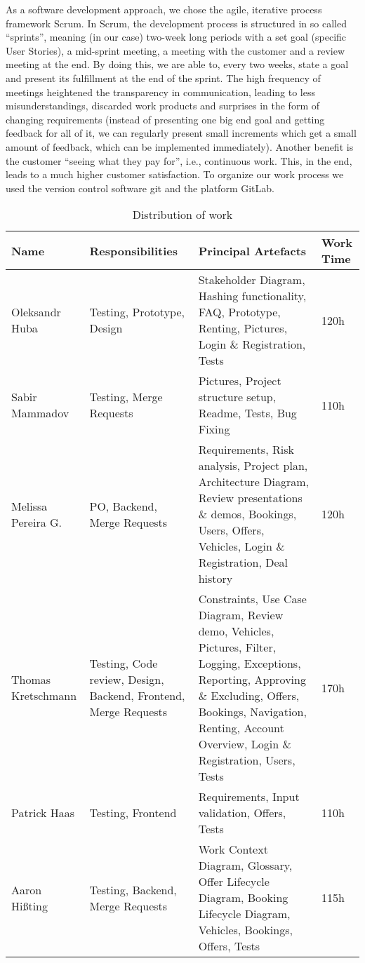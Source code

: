 As a software development approach, we chose the agile, iterative process framework Scrum. In Scrum, the development process is structured in so called “sprints”, meaning (in our case) two-week long periods with a set goal (specific User Stories), a mid-sprint meeting, a meeting with the customer and a review meeting at the end. By doing this, we are able to, every two weeks, state a goal and present its fulfillment at the end of the sprint. The high frequency of meetings heightened the transparency in communication, leading to less misunderstandings, discarded work products and surprises in the form of changing requirements (instead of presenting one big end goal and getting feedback for all of it, we can regularly present small increments which get a small amount of feedback, which can be implemented immediately). Another benefit is the customer “seeing what they pay for”, i.e., continuous work. This, in the end, leads to a much higher customer satisfaction. To organize our work process we used the version control software git and the platform GitLab.

\begin{table}[h]
  \caption{Distribution of work}
  \centering
  \begin{tabular}{|p{3cm}||p{3cm}|p{6cm}|p{2cm}|}
    \hline
    Name & Responsibilities & Principal Artefacts & Work Time \\
    \hline
    Oleksandr Huba & Testing, Prototype, Design & Stakeholder Diagram, Hashing functionality, FAQ, Prototype, Renting, Pictures, Login \& Registration, Tests & 120h\\ 
    \hline
    Sabir Mammadov & Testing, Merge Requests & Pictures, Project structure setup, Readme, Tests, Bug Fixing & 110h\\ 
    \hline
    Melissa Pereira G. & PO, Backend, Merge Requests & Requirements, Risk analysis, Project plan, Architecture Diagram, Review presentations \& demos, Bookings, Users, Offers, Vehicles, Login \& Registration, Deal history & 120h\\ 
    \hline
    Thomas Kretschmann & Testing, Code review, Design, Backend, Frontend, Merge Requests & Constraints, Use Case Diagram, Review demo, Vehicles, Pictures, Filter, Logging, Exceptions, Reporting, Approving \& Excluding, Offers, Bookings, Navigation, Renting, Account Overview, Login \& Registration, Users, Tests & 170h\\ 
    \hline
    Patrick Haas & Testing, Frontend & Requirements, Input validation, Offers, Tests & 110h\\ 
    \hline
    Aaron Hißting & Testing, Backend, Merge Requests & Work Context Diagram, Glossary, Offer Lifecycle Diagram, Booking Lifecycle Diagram, Vehicles, Bookings, Offers, Tests & 115h\\
    \hline
  \end{tabular}
\end{table}